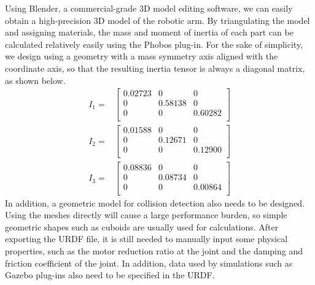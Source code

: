 \documentclass{article}
\begin{document}
Using Blender, a commercial-grade 3D model editing software, we can easily obtain a high-precision 3D model of the robotic arm.
By triangulating the model and assigning materials, the mass and moment of inertia of each part can be calculated relatively easily using the Phobos plug-in.
For the sake of simplicity, we design using a geometry with a mass symmetry axis aligned with the coordinate axis, so that the resulting inertia tensor is always a diagonal matrix, as shown below.
\[
    \begin{aligned}
        I_1 = &
        \begin{bmatrix}
            0.02723 & 0 & 0 \\
            0 & 0.58138 & 0 \\
            0 & 0 & 0.60282 \\
        \end{bmatrix} \\
        I_2 = &
        \begin{bmatrix}
            0.01588 & 0 & 0 \\
            0 & 0.12671 & 0 \\
            0 & 0 & 0.12900 \\
        \end{bmatrix} \\
        I_3 = &
        \begin{bmatrix}
            0.08836 & 0 & 0 \\
            0 & 0.08734 & 0 \\
            0 & 0 & 0.00864 \\
        \end{bmatrix}
    \end{aligned}
\]
In addition, a geometric model for collision detection also needs to be designed.
Using the meshes directly will cause a large performance burden, so simple geometric shapes such as cuboids are usually used for calculations.
After exporting the URDF file, it is still needed to manually input some physical properties, such as the motor reduction ratio at the joint and the damping and friction coefficient of the joint.
In addition, data used by simulations such as Gazebo plug-ins also need to be specified in the URDF.
\end{document}
